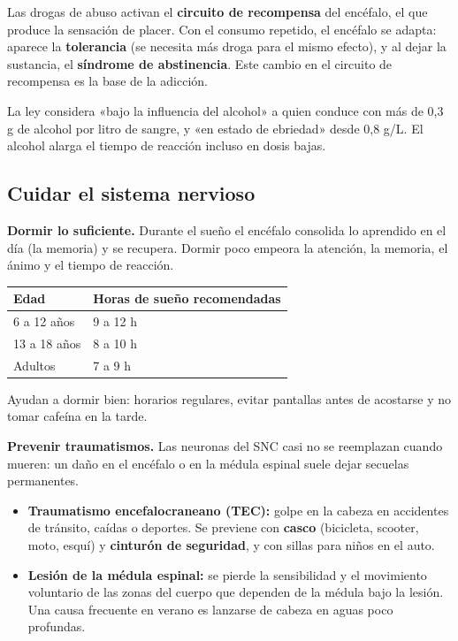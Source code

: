 \begin{clave} Las drogas de abuso activan el \textbf{circuito de recompensa} del encéfalo, el que produce la sensación de placer. Con el consumo repetido, el encéfalo se adapta: aparece la \textbf{tolerancia} (se necesita más droga para el mismo efecto), y al dejar la sustancia, el \textbf{síndrome de abstinencia}. Este cambio en el circuito de recompensa es la base de la adicción.\end{clave}
 
\begin{clave} La ley considera «bajo la influencia del alcohol» a quien conduce con más de 0,3 g de alcohol por litro de sangre, y «en estado de ebriedad» desde 0,8 g/L. El alcohol alarga el tiempo de reacción incluso en dosis bajas.\end{clave}
\subsection{Cuidar el sistema nervioso}
\textbf{Dormir lo suficiente.} Durante el sueño el encéfalo consolida lo aprendido en el día (la memoria) y se recupera. Dormir poco empeora la atención, la memoria, el ánimo y el tiempo de reacción.

 
\begin{center}\small
\begin{tabular}{@{}ll@{}}
\toprule
\textbf{Edad} & \textbf{Horas de sueño recomendadas} \\
\midrule
6 a 12 años & 9 a 12 h \\
13 a 18 años & 8 a 10 h \\
Adultos & 7 a 9 h \\
\bottomrule
\end{tabular}
\end{center}
 

Ayudan a dormir bien: horarios regulares, evitar pantallas antes de acostarse y no tomar cafeína en la tarde.

  

\textbf{Prevenir traumatismos.} Las neuronas del SNC casi no se reemplazan cuando mueren: un daño en el encéfalo o en la médula espinal suele dejar secuelas permanentes.

 
\begin{itemize}
  \item \textbf{Traumatismo encefalocraneano (TEC):} golpe en la cabeza en accidentes de tránsito, caídas o deportes. Se previene con \textbf{casco} (bicicleta, scooter, moto, esquí) y \textbf{cinturón de seguridad}, y con sillas para niños en el auto.
  \item \textbf{Lesión de la médula espinal:} se pierde la sensibilidad y el movimiento voluntario de las zonas del cuerpo que dependen de la médula bajo la lesión. Una causa frecuente en verano es lanzarse de cabeza en aguas poco profundas.
\end{itemize}
